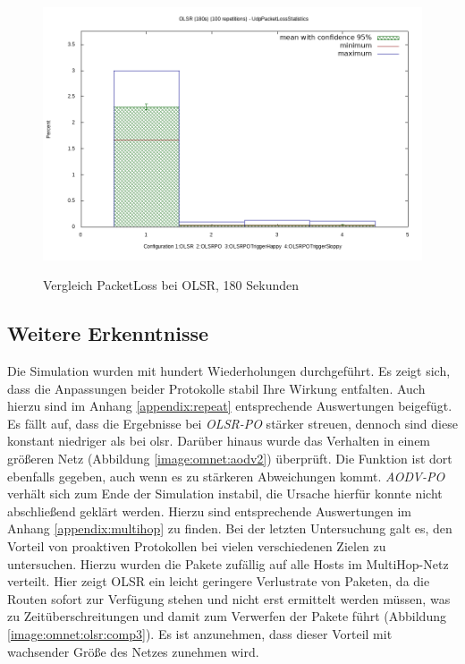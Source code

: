 \begin{figure}
  \centering
  \includegraphics[scale=0.4]{bilder/so3.png} \\
  \caption{Vergleich PacketLoss bei OLSR, 180 Sekunden}
  \label{image:omnet:olsr:so3}
\end{figure}

\subsection{Weitere Erkenntnisse}
\label{chapter:auswertung:erkenntnisse}

Die Simulation wurden mit hundert Wiederholungen durchgeführt. Es zeigt sich, dass die Anpassungen beider Protokolle stabil Ihre Wirkung entfalten. Auch hierzu sind im Anhang \ref{appendix:repeat} entsprechende Auswertungen beigefügt. Es fällt auf, dass die Ergebnisse bei \textit{OLSR-PO} stärker streuen, dennoch sind diese konstant niedriger als bei \gls{olsr}. Darüber hinaus wurde das Verhalten in einem größeren Netz (Abbildung \ref{image:omnet:aodv2}) überprüft. Die Funktion ist dort ebenfalls gegeben, auch wenn es zu stärkeren Abweichungen kommt. \textit{AODV-PO} verhält sich zum Ende der Simulation instabil, die Ursache hierfür konnte nicht abschließend geklärt werden. Hierzu sind entsprechende Auswertungen im Anhang \ref{appendix:multihop} zu finden. Bei der letzten Untersuchung galt es, den Vorteil von proaktiven Protokollen bei vielen verschiedenen Zielen zu untersuchen. Hierzu wurden die Pakete zufällig auf alle Hosts im MultiHop-Netz verteilt. Hier zeigt OLSR ein leicht geringere Verlustrate von Paketen, da die Routen sofort zur Verfügung stehen und nicht erst ermittelt werden müssen, was zu Zeitüberschreitungen und damit zum Verwerfen der Pakete führt (Abbildung \ref{image:omnet:olsr:comp3}). Es ist anzunehmen, dass dieser Vorteil mit wachsender Größe des Netzes zunehmen wird.

